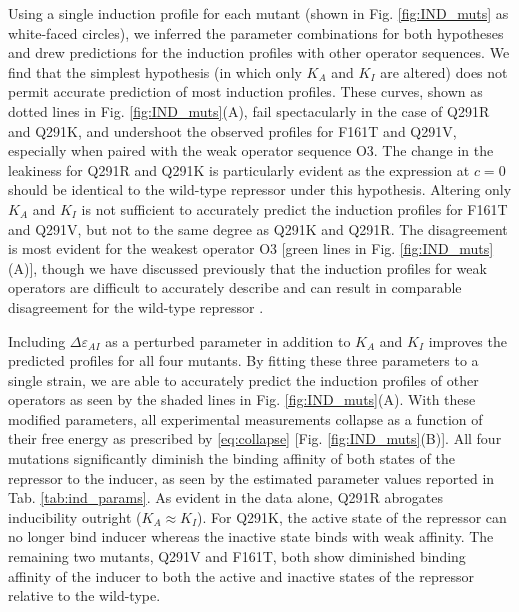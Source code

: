 Using a single induction profile for each mutant (shown in Fig. \ref{fig:IND_muts} as white-faced circles), we inferred the parameter
combinations for both hypotheses and drew predictions for the induction
profiles with other operator sequences. We find that the simplest hypothesis (in
which only $K_A$ and $K_I$ are
altered) does not permit accurate prediction of most induction profiles.
These curves, shown as dotted lines in Fig. \ref{fig:IND_muts}(A), fail
spectacularly in
the case of Q291R and Q291K, and undershoot the observed profiles for F161T
and Q291V, especially when paired with the weak operator sequence O3. The
change in the leakiness for Q291R and Q291K is particularly evident as the
expression at $c = 0$ should be identical to the wild-type repressor under this hypothesis.
Altering only $K_A$ and $K_I$ is not sufficient to accurately predict the
induction profiles for F161T and Q291V, but not to the same degree as Q291K
and Q291R. The disagreement is most evident for the weakest operator O3
[green lines in Fig. \ref{fig:IND_muts}(A)], though we have discussed
previously that the induction profiles for weak operators are difficult to
accurately describe and can result in comparable disagreement for the
wild-type repressor \cite{Razo-Mejia2018, Barnes2018}.

Including $\Delta\varepsilon_{AI}$ as a perturbed parameter in addition to
$K_A$ and $K_I$ improves the predicted profiles for all four mutants. By
fitting these three parameters to a single strain, we are able to accurately
predict the induction profiles of other operators as seen by the shaded lines
in Fig. \ref{fig:IND_muts}(A). With these modified parameters, all
experimental measurements collapse as a function of their free energy as
prescribed by \eqref{eq:collapse} [Fig. \ref{fig:IND_muts}(B)]. All four
mutations significantly diminish the binding affinity of both states of the
repressor to the inducer, as seen by the estimated parameter values reported in
Tab. \ref{tab:ind_params}. As evident in the data alone, Q291R abrogates
inducibility outright ($K_A \approx K_I$).
For Q291K, the active state of the
repressor can no longer bind inducer whereas the inactive state binds with
weak affinity. The remaining two mutants, Q291V and F161T, both show
diminished binding affinity of the inducer to both the active and inactive
states of the repressor relative to the wild-type. 

